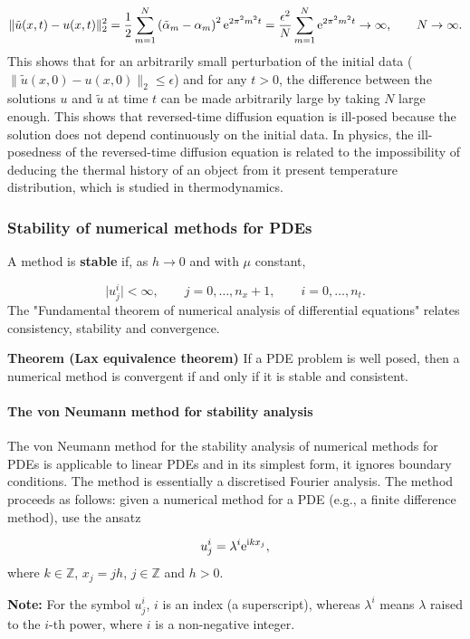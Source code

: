\documentclass[12pt,a4paper]{article}
\begin{document}
\[
\|\tilde{u}(x,t) - u(x,t)\|_2^2 =  \frac{1}{2}\sum_{m=1}^{N} \left(\tilde{\alpha}_m - \alpha_m\right)^2 {\rm e}^{2\pi^2 m^2 t} = \frac{\epsilon^2}{N}\sum_{m=1}^{N} {\rm e}^{2\pi^2 m^2 t} \to \infty, \qquad N\to \infty.
\]
This shows that for an arbitrarily small perturbation of the initial data ($\|\tilde{u}(x,0) - u(x,0)\|_2 \leq \epsilon$) and for any $t > 0$, the difference between the solutions $u$ and $\tilde{u}$ at time $t$ can be made arbitrarily large by taking $N$ large enough. This shows that reversed-time diffusion equation is ill-posed because the solution does not depend continuously on the initial data.  In physics, the ill-posedness of the reversed-time diffusion equation is related to the impossibility of deducing the thermal history of an object from it present temperature distribution, which is studied in thermodynamics.

\subsubsection{Stability of numerical methods for PDEs}
A method is \textbf{stable} if, as $h \to 0$ and with $\mu$ constant,

\[
\vert u^i_j \vert < \infty, \qquad    j = 0, \ldots, n_x+1, \qquad i = 0, \ldots, n_t.
\]
The "Fundamental theorem of numerical analysis of differential equations" relates consistency, stability and convergence.

\textbf{Theorem (Lax equivalence theorem)} If a PDE problem is well posed, then a numerical method is convergent if and only if it is stable and consistent.

\paragraph{The von Neumann method for stability analysis}
The von Neumann method for the stability analysis of numerical methods for PDEs is applicable to linear PDEs and in its simplest form, it ignores boundary conditions. The method is essentially a discretised Fourier analysis.  The method proceeds as follows: given a numerical method for a PDE (e.g., a finite difference method), use the ansatz

\[
u^i_j = \lambda^i {\rm e}^{{\rm i}k x_j},
\]
where $k \in \mathbb{Z}$, $x_j = j h$, $j \in \mathbb{Z}$ and $h > 0$. 

\textbf{Note:} For the symbol $u^i_j$, $i$ is an index (a superscript), whereas $\lambda^i$ means $\lambda$ raised to the $i$-th power, where $i$ is a non-negative integer.  
\end{document}

